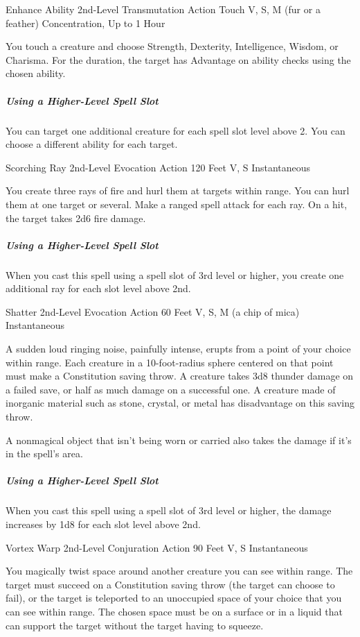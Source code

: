 \documentclass[letterpaper,openany,oneside,twocolumn]{book}
\begin{document}
\DndSpellHeader
  {Enhance Ability}
  {2nd-Level Transmutation}
  {Action}
  {Touch}
  {V, S, M (fur or a feather)}
  {Concentration, Up to 1 Hour}

You touch a creature and choose Strength, Dexterity, Intelligence, Wisdom, or Charisma. For the duration, the target has Advantage on ability checks using the chosen ability.

\subparagraph*{Using a Higher-Level Spell Slot} You can target one additional creature for each spell slot level above 2. You can choose a different ability for each target.

\DndSpellHeader
  {Scorching Ray}
  {2nd-Level Evocation}
  {Action}
  {120 Feet}
  {V, S}
  {Instantaneous}

You create three rays of fire and hurl them at targets within range. You can hurl them at one target or several. Make a ranged spell attack for each ray. On a hit, the target takes 2d6 fire damage.

\subparagraph*{Using a Higher-Level Spell Slot} When you cast this spell using a spell slot of 3rd level or higher, you create one additional ray for each slot level above 2nd.

\DndSpellHeader
  {Shatter}
  {2nd-Level Evocation}
  {Action}
  {60 Feet}
  {V, S, M (a chip of mica)}
  {Instantaneous}

A sudden loud ringing noise, painfully intense, erupts from a point of your choice within range. Each creature in a 10-foot-radius sphere centered on that point must make a Constitution saving throw. A creature takes 3d8 thunder damage on a failed save, or half as much damage on a successful one. A creature made of inorganic material such as stone, crystal, or metal has disadvantage on this saving throw.

A nonmagical object that isn't being worn or carried also takes the damage if it's in the spell's area.

\subparagraph*{Using a Higher-Level Spell Slot} When you cast this spell using a spell slot of 3rd level or higher, the damage increases by 1d8 for each slot level above 2nd.

\DndSpellHeader
  {Vortex Warp}
  {2nd-Level Conjuration}
  {Action}
  {90 Feet}
  {V, S}
  {Instantaneous}

You magically twist space around another creature you can see within range. The target must succeed on a Constitution saving throw (the target can choose to fail), or the target is teleported to an unoccupied space of your choice that you can see within range. The chosen space must be on a surface or in a liquid that can support the target without the target having to squeeze.
\end{document}
